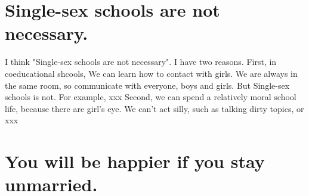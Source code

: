 \documentclass[11pt]{jsarticle}
\begin{document}
\section{Single-sex schools are not necessary.}
I think "Single-sex schools are not necessary". I have two reasons.
First, in coeducational shcools, We can learn how to contact with girls.
We are always in the same room, so communicate with everyone, boys and girls.
But Single-sex schools is not. 
For example, xxx
Second, we can spend a relatively moral school life, because there are girl's eye.
We can't act silly, such as talking dirty topics, or xxx

\section{You will be happier if you stay unmarried.}
\end{document}
